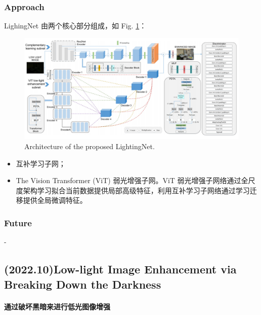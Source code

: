 \documentclass[letterpaper,10pt]{article}
\begin{document}
			\subsubsection{Approach}
			
			LighingNet 由两个核心部分组成，如 Fig. \ref{fig: LightingNet}：
			
			\begin{figure}[htbp]
				\centering 
				\includegraphics[width=\columnwidth]{picture/LLIE/LightingNet/LightingNet}
				\caption{
					\label{fig: LightingNet} 
					Architecture of the proposed LightingNet.
				}
			\end{figure}
			
			\begin{itemize}
				\item[(1)] 
				互补学习子网；
				
				\item[(2)]
				The Vision Transformer (ViT) 弱光增强子网。ViT 弱光增强子网络通过全尺度架构学习拟合当前数据提供局部高级特征，利用互补学习子网络通过学习迁移提供全局微调特征。
			\end{itemize}	
			
			\subsubsection{Future}
			
			-
		
		\subsection{(2022.10)Low-light Image Enhancement via Breaking Down the Darkness}
		
		\paragraph{通过破坏黑暗来进行低光图像增强}
		
\end{document}
